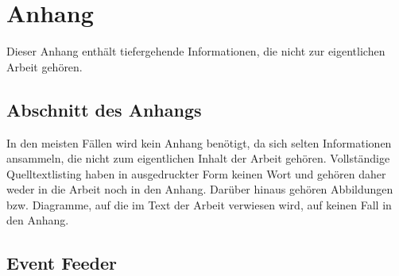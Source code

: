 
\chapter{Anhang}

Dieser Anhang enthält tiefergehende Informationen, die nicht zur eigentlichen Arbeit gehören.

\section{Abschnitt des Anhangs}

In den meisten Fällen wird kein Anhang benötigt, da sich selten Informationen ansammeln, die nicht zum eigentlichen Inhalt der Arbeit gehören. Vollständige Quelltextlisting haben in ausgedruckter Form keinen Wort und gehören daher weder in die Arbeit noch in den Anhang. Darüber hinaus gehören Abbildungen bzw. Diagramme, auf die im Text der Arbeit verwiesen wird, auf keinen Fall in den Anhang.

\section{Event Feeder}
\label{sec:Evet_Feeder}